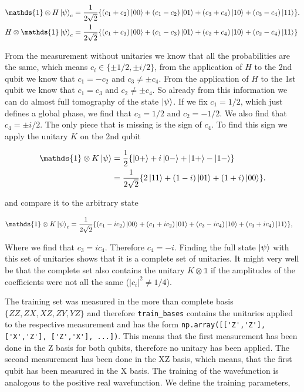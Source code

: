 \documentclass[submission, Phys]{SciPost}
\begin{document}
\begin{align}
 \mathds{1}  \otimes H  \ket{\psi}_c&= \frac{1}{2\sqrt{2}} \{ (c_1+c_2) \ket{00} + (c_1 -c_2)\ket{01} + (c_3 + c_4)\ket{10} + (c_3-c_4)\ket{11} \}.\\
 H  \otimes \mathds{1} \ket{\psi}_c&= \frac{1}{2\sqrt{2}} \{ (c_1+c_3) \ket{00} + (c_1 -c_3)\ket{01} + (c_2 + c_4)\ket{10} + (c_2-c_4)\ket{11} \}
\end{align}

From the measurement without unitaries we know that all the probabilities are the same, which means $c_i \in \{ \pm 1/2, \pm i/2 \}$, from the application of $H$ to the 2nd qubit we know that $c_1 = -c_2$ and $c_3 \neq \pm c_4$. From the application of $H$ to the 1st qubit we know that $c_1 = c_3$ and $c_2 \neq \pm c_4$. So already from this information we can do almost full tomography of the state $\ket{\psi}$. If we fix $c_1 = 1/2$, which just defines a global phase, we find that $c_3 = 1/2$ and $c_2 = -1/2$. We also find that $c_4 = \pm i/2$. The only piece that is missing is the sign of $c_4$. To find this sign we apply the unitary $K$ on the 2nd qubit

\begin{align}
\mathds{1} \otimes K \ket{\psi} &= \frac{1}{2} \{ \ket{0+} +i \ket{0-} + \ket{1+} -  \ket{1-} \} \\
&=  \frac{1}{2 \sqrt{2}} \{ 2 \ket{11} + (1-i)\ket{01} + (1+i)\ket{00} \}. 
\end{align}

and compare it to the arbitrary state 

\begin{align}
 \mathds{1}  \otimes K  \ket{\psi}_c&= \frac{1}{2\sqrt{2}} \{ (c_1-ic_2) \ket{00} + (c_1 +ic_2)\ket{01} + (c_3 -ic_4)\ket{10} + (c_3+ic_4)\ket{11} \},
\end{align}

Where we find that $c_3 = ic_4$. Therefore $c_4 = -i$. Finding the full state $\ket{\psi}$ with this set of unitaries shows that it is a complete set of unitaries. It might very well be that the complete set also contains the unitary $K \otimes \mathds{1} $ if the amplitudes of the coefficients were not all the same ($|c_i|^2 \neq 1/4$).

The training set was measured in the more than complete basis $\{ZZ, ZX, XZ, ZY, YZ \}$ and therefore \verb|train_bases| contains the unitaries applied to the respective measurement and has the form  \verb|np.array([['Z','Z'], ['X','Z'], ['Z','X'], ...])|. This means that the first measurement has been done in the Z basis for both qubits, therefore no unitary has been applied. The second measurement has been done in the XZ basis, which means, that the first qubit has been measured in the X basis. The training of the wavefunction is analogous to the positive real wavefunction. We define the training parameters,
\end{document}

